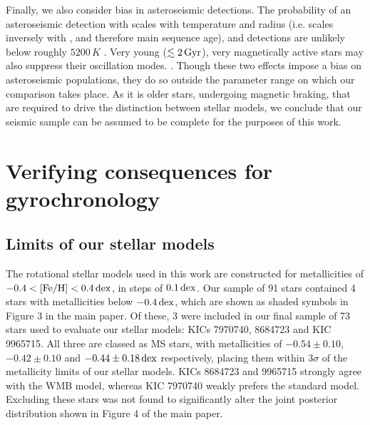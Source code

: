 Finally, we also consider bias in asteroseismic detections. The probability of an asteroseismic detection with \kepler scales with temperature and radius (i.e. scales inversely with \logg, and therefore main sequence age), and detections are unlikely below roughly $5200\, K$ \cite{chaplin+2011, schofield+2019}. Very young ($\lesssim 2\, \rm{Gyr}$), very magnetically active stars may also suppress their oscillation modes. \cite{mathur+2019}. Though these two effects impose a bias on asteroseismic populations, they do so outside the parameter range on which our comparison takes place. As it is older stars, undergoing magnetic braking, that are required to drive the distinction between stellar models, we conclude that our seismic sample can be assumed to be complete for the purposes of this work.

\section{Verifying consequences for gyrochronology}
\subsection{Limits of our stellar models}\label{ssec:limits}
The rotational stellar models used in this work \cite{vansaders+2019} are constructed for metallicities of $-0.4 < \rm{[Fe/H]} < 0.4\, \rm{dex}$, in steps of $0.1\, \rm {dex}$. Our sample of 91 stars contained 4 stars with metallicities below $-0.4\, \rm{dex}$, which are shown as shaded symbols in Figure 3 in the main paper. Of these, 3 were included in our final sample of 73 stars used to evaluate our stellar models: KICs 7970740, 8684723 and KIC 9965715. All three are classed as MS stars, with metallicities of $-0.54 \pm 0.10$, $-0.42 \pm 0.10$ and $-0.44 \pm 0.18\, \rm {dex}$ respectively, placing them within $3\sigma$ of the metallicity limits of our stellar models. KICs 8684723 and 9965715 strongly agree with the WMB model, whereas KIC 7970740 weakly prefers the standard model. Excluding these stars was not found to significantly alter the joint posterior distribution shown in Figure 4 of the main paper.

